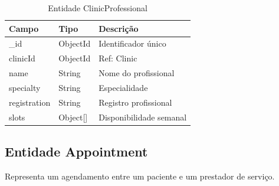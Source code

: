 \begin{table}[H]
  \centering
  \caption{Entidade ClinicProfessional}
  \label{tab:entity-clinic-professional}
  \begin{tabular}{p{3cm}p{3cm}p{5.5cm}}
    \toprule
    \textbf{Campo} &
    \textbf{Tipo} &
    \textbf{Descrição} \\
    \midrule
    \_id          & ObjectId  & Identificador único \\
    clinicId      & ObjectId  & Ref: Clinic \\
    name          & String    & Nome do profissional \\
    specialty     & String    & Especialidade \\
    registration  & String    & Registro profissional \\
    slots         & Object[]  & Disponibilidade semanal \\
    \bottomrule
  \end{tabular}
\end{table}

\subsection{Entidade Appointment}
\label{subsec:entity-appointment}

Representa um agendamento entre um paciente e um
prestador de serviço.

